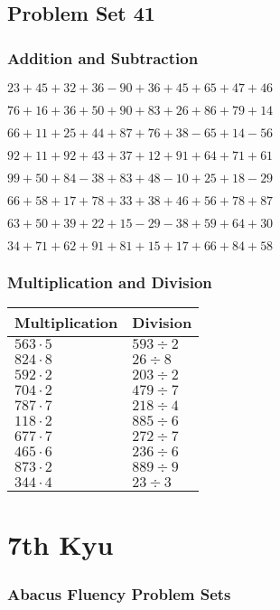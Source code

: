\hypertarget{problem-set-41}{%
\subsection{Problem Set 41}\label{problem-set-41}}

\hypertarget{addition-and-subtraction-40}{%
\subsubsection{Addition and
Subtraction}\label{addition-and-subtraction-40}}

\(23+45+32+36-90+36+45+65+47+46\)

\(76+16+36+50+90+83+26+86+79+14\)

\(66+11+25+44+87+76+38-65+14-56\)

\(92+11+92+43+37+12+91+64+71+61\)

\(99+50+84-38+83+48-10+25+18-29\)

\(66+58+17+78+33+38+46+56+78+87\)

\(63+50+39+22+15-29-38+59+64+30\)

\(34+71+62+91+81+15+17+66+84+58\)

\hypertarget{multiplication-and-division-40}{%
\subsubsection{Multiplication and
Division}\label{multiplication-and-division-40}}

\begin{longtable}[]{@{}ll@{}}
\toprule
Multiplication & Division\tabularnewline
\midrule
\endhead
\(563\cdot5\) & \(593÷2\)\tabularnewline
\(824\cdot8\) & \(26÷8\)\tabularnewline
\(592\cdot2\) & \(203÷2\)\tabularnewline
\(704\cdot2\) & \(479÷7\)\tabularnewline
\(787\cdot7\) & \(218÷4\)\tabularnewline
\(118\cdot2\) & \(885÷6\)\tabularnewline
\(677\cdot7\) & \(272÷7\)\tabularnewline
\(465\cdot6\) & \(236÷6\)\tabularnewline
\(873\cdot2\) & \(889÷9\)\tabularnewline
\(344\cdot4\) & \(23÷3\)\tabularnewline
\bottomrule
\end{longtable}

\hypertarget{th-kyu-1}{%
\section{7th Kyu}\label{th-kyu-1}}

\hypertarget{abacus-fluency-problem-sets-1}{%
\subsubsection{Abacus Fluency Problem
Sets}\label{abacus-fluency-problem-sets-1}}

